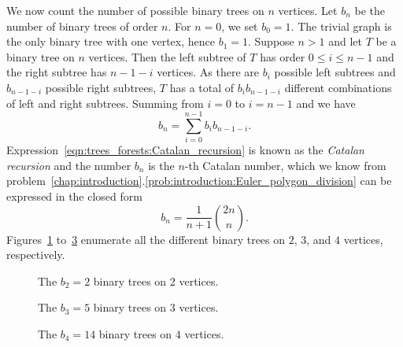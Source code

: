 We now count the number of possible binary trees on $n$
vertices. Let $b_n$ be the number of binary trees of order $n$. For
$n = 0$, we set $b_0 = 1$. The trivial graph is the only binary tree
with one vertex, hence $b_1 = 1$. Suppose $n > 1$ and let $T$ be a
binary tree on $n$ vertices. Then the left subtree of $T$ has order
$0 \leq i \leq n - 1$ and the right subtree has $n - 1 - i$
vertices. As there are $b_i$ possible left subtrees and $b_{n-1-i}$
possible right subtrees, $T$ has a total of $b_i b_{n-1-i}$ different
combinations of left and right subtrees. Summing from $i = 0$ to
$i = n - 1$ and we have
\begin{equation}
\label{eqn:trees_forests:Catalan_recursion}
b_n
=
\sum_{i=0}^{n-1} b_i b_{n-1-i}.
\end{equation}
Expression~\eqref{eqn:trees_forests:Catalan_recursion} is known as the
\emph{Catalan recursion} and the number $b_n$
is the $n$-th Catalan number, which we know from
problem~\ref{chap:introduction}.\ref{prob:introduction:Euler_polygon_division}
can be expressed in the closed form
\begin{equation}
\label{eqn:trees_forests:nth_Catalan_number_closed_form}
b_n
=
\frac{1}{n+1} \binom{2n}{n}.
\end{equation}
Figures~\ref{fig:trees_forests:binary_trees_2_vertices}
to~\ref{fig:trees_forests:binary_trees_4_vertices} enumerate all the
different binary trees on $2$, $3$, and $4$ vertices, respectively.

\begin{figure}[!htbp]
\centering
{}

\caption{The $b_2 = 2$ binary trees on $2$ vertices.}
\label{fig:trees_forests:binary_trees_2_vertices}
\end{figure}

\begin{figure}[!htbp]
\centering
{}

\caption{The $b_3 = 5$ binary trees on $3$ vertices.}
\label{fig:trees_forests:binary_trees_3_vertices}
\end{figure}

\begin{figure}[!htbp]
\centering
{}

\caption{The $b_4 = 14$ binary trees on $4$ vertices.}
\label{fig:trees_forests:binary_trees_4_vertices}
\end{figure}

